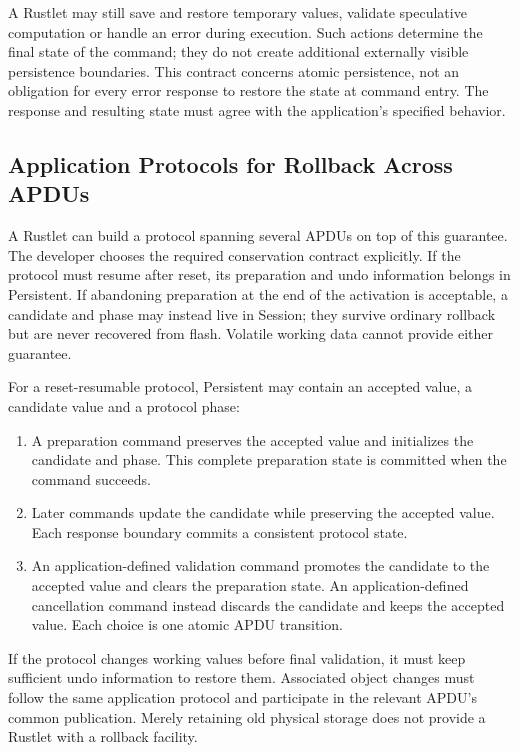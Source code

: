 A Rustlet may still save and restore temporary values, validate speculative
computation or handle an error during execution. Such actions determine the
final state of the command; they do not create additional externally visible
persistence boundaries. This contract concerns atomic persistence, not an
obligation for every error response to restore the state at command entry.
The response and resulting state must agree with the application's specified
behavior.

\subsection{Application Protocols for Rollback Across APDUs}

A Rustlet can build a protocol spanning several APDUs on top of this guarantee.
The developer chooses the required conservation contract explicitly. If the
protocol must resume after reset, its preparation and undo information belongs
in Persistent. If abandoning preparation at the end of the activation is
acceptable, a candidate and phase may instead live in Session; they survive
ordinary rollback but are never recovered from flash. Volatile working data
cannot provide either guarantee.

For a reset-resumable protocol, Persistent may contain an accepted value,
a candidate value and a protocol phase:
\begin{enumerate}
\item A preparation command preserves the accepted value and initializes the
  candidate and phase. This complete preparation state is committed when the
  command succeeds.
\item Later commands update the candidate while preserving the accepted
  value. Each response boundary commits a consistent protocol state.
\item An application-defined validation command promotes the candidate to the
  accepted value and clears the preparation state. An application-defined
  cancellation command instead discards the candidate and keeps the accepted
  value. Each choice is one atomic APDU transition.
\end{enumerate}

If the protocol changes working values before final validation, it must keep
sufficient undo information to restore them. Associated object changes must
follow the same application protocol and participate in the relevant APDU's
common publication. Merely retaining old physical storage does not provide a
Rustlet with a rollback facility.

